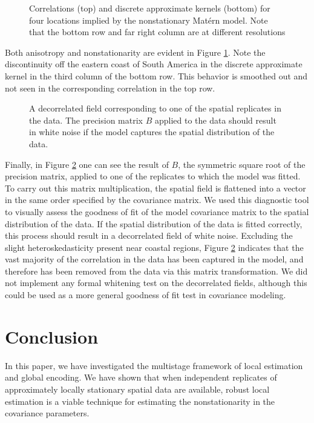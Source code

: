 \documentclass[review]{elsarticle}
\begin{document}
\begin{figure}
    \centering
    \caption{Correlations (top) and discrete approximate kernels (bottom) for four locations implied by the nonstationary Mat\'ern model. Note that the bottom row and far right column are at different resolutions}
    \label{f:5}
\end{figure}

Both anisotropy and nonstationarity are evident in Figure \ref{f:5}. Note the discontinuity off the eastern coast of South America in the discrete approximate kernel in the third column of the bottom row. This behavior is smoothed out and not seen in the corresponding correlation in the top row.


\begin{figure}
    \centering
    \caption{A decorrelated field corresponding to one of the spatial replicates in the data. The precision matrix $B$ applied to the data should result in white noise if the model captures the spatial distribution of the data.}
    \label{f:6}
\end{figure}

Finally, in Figure \ref{f:6} one can see the result of $B$, the symmetric square root of the precision matrix, applied to one of the replicates to which the model was fitted. To carry out this matrix multiplication, the spatial field is flattened into a vector in the same order specified by the covariance matrix. We used this diagnostic tool to visually assess the goodness of fit of the model covariance matrix to the spatial distribution of the data. If the spatial distribution of the data is fitted correctly, this process should result in a decorrelated field of white noise. Excluding the slight heteroskedasticity present near coastal regions, Figure \ref{f:6} indicates that the vast majority of the correlation in the data has been captured in the model, and therefore has been removed from the data via this matrix transformation. We did not implement any formal whitening test on the decorrelated fields, although this could be used as a more general goodness of fit test in covariance modeling.


\section{Conclusion}

In this paper, we have investigated the multistage framework of local estimation and global encoding. We have shown that when independent replicates of approximately locally stationary spatial data are available, robust local estimation is a viable technique for estimating the nonstationarity in the covariance parameters.
\end{document}
